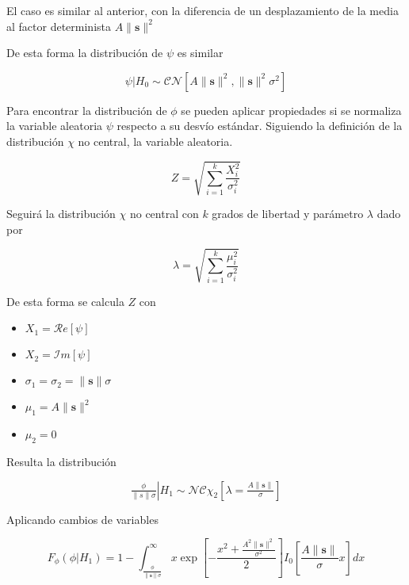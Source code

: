 El caso es similar al anterior, con la diferencia de un desplazamiento de la media al factor determinista $A\rVert \mathbf{s} \rVert ^2$

De esta forma la distribución de $\psi$ es similar

\begin{equation}
    \psi|H_0 \sim \mathcal{CN}[A\lVert\mathbf{s}\rVert^2, \lVert\mathbf{s}\rVert^2 \sigma^2]    
\end{equation}

Para encontrar la distribución de $\phi$ se pueden aplicar propiedades si se normaliza la variable aleatoria $\psi$ respecto a su desvío estándar. Siguiendo la definición de la distribución $\chi$ no central, la variable aleatoria. 

\begin{equation}
    Z = \sqrt{\sum_{i=1}^{k}\frac{X_i^2}{\sigma_i^2}}
\end{equation}


Seguirá la distribución $\chi$ no central con $k$ grados de libertad y parámetro $\lambda$ dado por

\begin{equation}
    \lambda = \sqrt{\sum_{i=1}^{k}\frac{\mu_i^2}{\sigma_i^2}}
\end{equation}

De esta forma se calcula $Z$ con 

\begin{itemize}
    \item $X_1 = \mathcal{R}e\left[\psi\right]$
    \item $X_2 = \mathcal{I}m\left[\psi\right]$
    \item $\sigma_1 = \sigma_2 = \lVert \mathbf{s} \rVert \sigma$
    \item $\mu_1 = A\rVert\mathbf{s}\rVert^2$
    \item $\mu_2 = 0$
\end{itemize}

Resulta la distribución

\begin{equation}
    \left.\tfrac{\phi}{\lVert s\rVert\sigma} \right\vert H_1 \sim \mathcal{NC\chi}_{2}\left[\lambda = \tfrac{A\lVert\mathbf{s}\rVert}{\sigma}\right] 
\end{equation}


Aplicando cambios de variables

\begin{equation}
    F_\phi(\phi|H_1) = 1-\int_{\frac{\phi}{\lVert\mathbf{s}\rVert\sigma}}^\infty x\exp\left[-\frac{x^2 + \frac{A^2\lVert\mathbf{s}\rVert^2}{\sigma^2}}{2}\right]I_0\left[\frac{A\lVert\mathbf{s}\rVert}{\sigma} x\right] dx
\end{equation}

